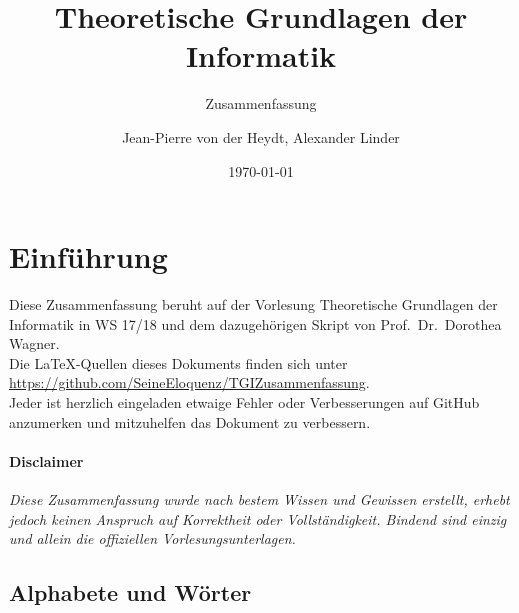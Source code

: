 \documentclass[11pt]{scrartcl}
\title{Theoretische Grundlagen der Informatik}
\subtitle{Zusammenfassung}
\author{Jean-Pierre von der Heydt, Alexander Linder}
\date{\today}
\theoremstyle{break}
\begin{document}
    \maketitle
    \pagebreak

    \tableofcontents
    \pagebreak



    \section{Einführung}
	\label{sec:einführung}

    Diese Zusammenfassung beruht auf der Vorlesung Theoretische Grundlagen der Informatik in WS 17/18 und dem dazugehörigen Skript von Prof.\ Dr.\ Dorothea Wagner.\\
    Die \LaTeX-Quellen dieses Dokuments finden sich unter \url{https://github.com/SeineEloquenz/TGIZusammenfassung}.\\
    Jeder ist herzlich eingeladen etwaige Fehler oder Verbesserungen auf GitHub anzumerken und mitzuhelfen das Dokument
    zu verbessern.

    \paragraph{Disclaimer}
    \textit{
        Diese Zusammenfassung wurde nach bestem Wissen und Gewissen erstellt, erhebt jedoch keinen Anspruch auf Korrektheit
        oder Vollständigkeit.
        Bindend sind einzig und allein die offiziellen Vorlesungsunterlagen.
    }

    \subsection{Alphabete und Wörter}
	\label{subsec:alphabete-und-wörter}
\end{document}
